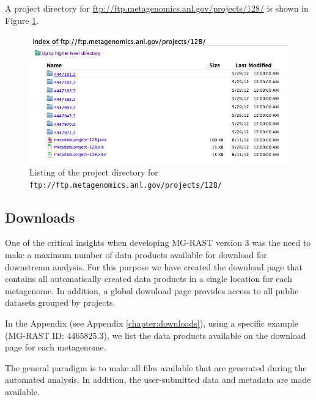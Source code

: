 \documentclass[12pt,fullpage]{report}
\begin{document}

A project directory for \url{ftp://ftp.metagenomics.anl.gov/projects/128/}
is shown in Figure \ref{fig:ftp-server-project-view}.


\begin{figure}[ht]
\begin{center}
\includegraphics[width=6in]{Images/ftp-server-project-view.png}
\end{center}
\caption{Listing of the project directory for \texttt{ftp://ftp.metagenomics.anl.gov/projects/128/}
}
\label{fig:ftp-server-project-view}
\end{figure}



\subsection{Downloads}
One of the critical insights when developing MG-RAST version 3 was the need to make a maximum number of data products available for download for downstream analysis. For this purpose we have created the download page that contains all automatically created data products in a single location for each metagenome. In addition, a global download page provides access to all public datasets grouped by projects.

In the Appendix (see Appendix \ref{chapter:downloads}),
using a specific example (MG-RAST ID: 4465825.3),
we list the data products available on the download page for each metagenome.

The general paradigm is to make all files available that are generated during the automated analysis. In addition, the user-submitted data and metadata are made available.
\end{document}
